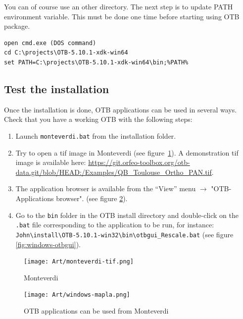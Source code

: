 \documentclass[10pt,a4paper]{article}
\begin{document}
You can of course use an other directory. The next step is to update PATH
environment variable. This must be done one time before starting using OTB package.

\begin{verbatim}
open cmd.exe (DOS command)
cd C:\projects\OTB-5.10.1-xdk-win64
set PATH=C:\projects\OTB-5.10.1-xdk-win64\bin;%PATH%
\end{verbatim}

\subsection{Test the installation}
Once the installation is done, OTB applications can be used in several
ways. Check that you have a working OTB with the following steps:

\begin{enumerate}

\item Launch \texttt{monteverdi.bat} from the installation folder.

\item Try to open a tif image in Monteverdi (see
figure~\ref{fig:monteverdi}). A demonstration tif image is available here: \url{https://git.orfeo-toolbox.org/otb-data.git/blob/HEAD:/Examples/QB\_Toulouse\_Ortho\_PAN.tif}.

\item The application browser is available from the ``View'' menu 
$\rightarrow$ "OTB-Applications browser".
(see figure \ref{fig:windows-mapla}).

\item Go to the \texttt{bin} folder in the OTB install directory and double-click on the \texttt{.bat} file corresponding to the application to be run, for instance:\\
\texttt{John{\textbackslash}install{\textbackslash}OTB-5.10.1-win32{\textbackslash}bin{\textbackslash}otbgui\_Rescale.bat}
(see figure \ref{fig:windows-otbgui}).

\end{enumerate}

\begin{figure}[!htbp]
  \center
  \texttt{[image: Art/monteverdi-tif.png]}
  \caption[]{Monteverdi}
  \label{fig:monteverdi}
\end{figure}

\begin{figure}[!htbp]
  \center
  \texttt{[image: Art/windows-mapla.png]}
  \caption[]{OTB applications can be used from Monteverdi}
  \label{fig:windows-mapla}
\end{figure}
\end{document}
